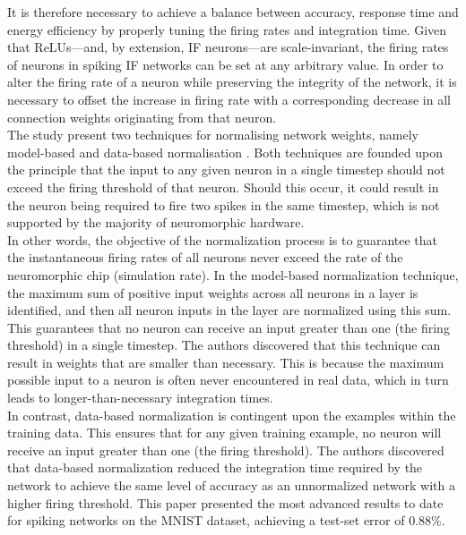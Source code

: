 \noindent It is therefore necessary to achieve a balance between accuracy, response time and energy efficiency by properly tuning the firing rates and integration time. Given that ReLUs—and, by extension, IF neurons—are scale-invariant, the firing rates of neurons in spiking IF networks can be set at any arbitrary value. In order to alter the firing rate of a neuron while preserving the integrity of the network, it is necessary to offset the increase in firing rate with a corresponding decrease in all connection weights originating from that neuron. \\

\noindent The study present two techniques for normalising network weights, namely model-based and data-based normalisation \cite{diehl2015fast}. Both techniques are founded upon the principle that the input to any given neuron in a single timestep should not exceed the firing threshold of that neuron. Should this occur, it could result in the neuron being required to fire two spikes in the same timestep, which is not supported by the majority of neuromorphic hardware. \\

\noindent In other words, the objective of the normalization process is to guarantee that the instantaneous firing rates of all neurons never exceed the rate of the neuromorphic chip (simulation rate). In the model-based normalization technique, the maximum sum of positive input weights across all neurons in a layer is identified, and then all neuron inputs in the layer are normalized using this sum. \\

\noindent This guarantees that no neuron can receive an input greater than one (the firing threshold) in a single timestep. The authors discovered that this technique can result in weights that are smaller than necessary. This is because the maximum possible input to a neuron is often never encountered in real data, which in turn leads to longer-than-necessary integration times. \\

\noindent In contrast, data-based normalization is contingent upon the examples within the training data. This ensures that for any given training example, no neuron will receive an input greater than one (the firing threshold). The authors discovered that data-based normalization reduced the integration time required by the network to achieve the same level of accuracy as an unnormalized network with a higher firing threshold. This paper presented the most advanced results to date for spiking networks on the MNIST dataset, achieving a test-set error of 0.88\%. \\

